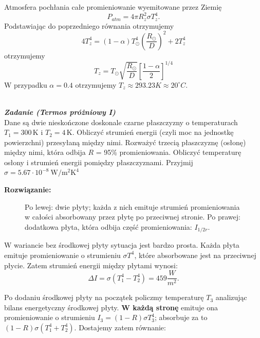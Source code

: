 \documentclass[11pt,a4paper]{article}
\newcounter{zadanie}\newcommand{\zadanie}[1][]{\addtocounter{zadanie}{1} ~\\  {\bf \emph{Zadanie \arabic{zadanie} #1 }} \\}
\begin{document}
Atmosfera pochłania całe promieniowanie wyemitowane przez  Ziemię  
$$
P_{atm} =  4\pi R_z^2 \sigma T_z^4.
$$
Podstawiając do poprzedniego równania otrzymujemy
$$
4   T_z^4 = (1-\alpha)T_\odot^4 \left(\frac{R_\odot}{D}\right)^2  
+ 2  T_z^4 
$$
otrzymujemy
$$
T_z = T_\odot \sqrt{\frac{R_\odot}{ D}} \left[\frac{1-\alpha}{2}\right]^{1/4}
$$
W przypadku $\alpha=0.4$ otrzymujemy $T_z \approx 293.23 K \approx 20^\circ C$.


\newpage

\zadanie [(Termos próżniowy I)]
Dane są dwie nieskończone doskonale czarne płaszczyzny o temperaturach $T_1=300\,$K i $T_2=4$\,K.
Obliczyć strumień energii (czyli moc na jednostkę powierzchni)
przesyłaną między nimi. Rozważyć trzecią płaszczyznę (osłonę)
między nimi, która odbija $R$ = 95\% promieniowania. 
Obliczyć temperaturę osłony i strumień energii pomiędzy płaszczyznami.
Przyjmij $\sigma = 5.67\cdot 10^{-8}~\mathrm{W/m^{2}K^{4}}$

\vskip 10pt
\textbf{Rozwiązanie:}\\

\begin{figure}\vspace{-0.1cm}
  \caption{Po lewej: dwie płyty; każda z nich emituje strumień promieniowania w całości absorbowany
    przez płytę po przeciwnej stronie.
    Po prawej: dodatkowa płyta, która odbija część promieniowania: $I_{1/2r}$.}
\end{figure}

W wariancie bez środkowej płyty sytuacja jest bardzo prosta. Każda płyta emituje promieniowanie
o strumieniu $\sigma T^4$, które absorbowane jest na przeciwnej płycie. Zatem strumień energii między płytami wynosi:
\begin{equation}
\Delta I = \sigma(T_1^4-T_2^4) = 459 \frac{W}{m^2}.
\end{equation}

Po dodaniu środkowej płyty na początek policzmy temperaturę $T_3$ analizując bilans energetyczny środkowej
płyty. \textbf{W każdą stronę} emituje ona promieniowanie o strumieniu $I_3 = (1-R)\sigma T_3^4$; absorbuje
za to $(1-R)\sigma (T_1^4 +T_2^4)$.
Dostajemy zatem równanie:
\end{document}
